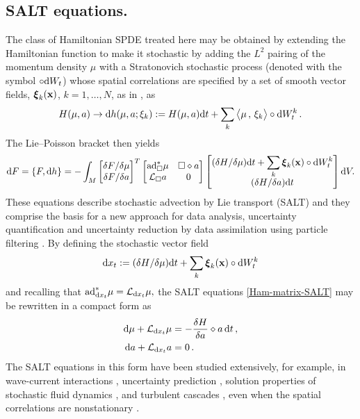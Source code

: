 \documentclass[11pt, oneside]{article}   	%
\numberwithin{equation}{section}
\theoremstyle{plain}
\theoremstyle{definition}
\theoremstyle{remark}
\newcommand{\<}{\langle}
\renewcommand{\>}{\rangle}
\def\diff{\textnormal{d}}
\def\x{{\bf{x}}}
\def\rmd{{\mathrm{d}}}
\newcommand{\scp}[2]{{\big\langle {#1}\, , \, {#2}\big\rangle}}
\newcommand{\mb}[1]{\mbox{\boldmath{$#1$}}}
\begin{document}
\subsection{SALT equations.}

The class of Hamiltonian SPDE treated here may be obtained by extending the Hamiltonian function to make it stochastic by adding the $L^2$ pairing of the momentum density $\mu$ with a Stratonovich stochastic process (denoted with the symbol $\circ \diff W_t$) whose spatial correlations are specified by a set of smooth vector fields, $\mb{\xi}_k(\x)$, $k=1,\dots,N$, as in 
\cite{Holm2015}, as
\begin{align}
H(\mu,a) \to \diff {h(\mu,a;\xi_k) }
:= H(\mu,a)\diff t + \displaystyle\sum_k\scp{\mu}{\xi_k}\circ \diff W_t^k
\,.\label{Stoch-Ham}
\end{align}
The Lie--Poisson bracket then yields  
\begin{align}
\diff  {F} =\{ F, \diff {h}\}
=
-\int_M 
\begin{bmatrix}
{\delta F}/{\delta \mu} \\  {\delta F}/{ \delta a} 
\end{bmatrix}^T
\begin{bmatrix}
{\rm ad}^*_{\Box}\mu & \Box \diamond a
\\ 
\mathcal{L}_{\Box}a & 0
\end{bmatrix}
\begin{bmatrix}
({\delta H } / {\delta \mu})\diff t + \displaystyle\sum_k\mb{\xi}_k(\x)\circ \diff W_t^k
\\  ({\delta H}/{ \delta a} ) \diff t 
\end{bmatrix}
{\rmd}V.
\label{Ham-matrix-SALT}
\end{align}
These equations describe stochastic advection by Lie transport (SALT)
\cite{Holm2015} and they comprise the basis for a new approach for data analysis, uncertainty quantification and uncertainty reduction by data assimilation using particle filtering \cite{CCHOS18b,CCHOS18a}. By defining the stochastic vector field 
\begin{align}
\diff{x_t} := 
({\delta H } / {\delta \mu})\diff t + \displaystyle\sum_k \mb{\xi}_k(\x)\circ \diff W_t^k
\label{Stoch-Lag-traj}
\end{align}
and recalling that ${\rm ad}^*_{{\rm d}x_t}\mu
= \mathcal{L}_{{\rm d}x_t}\mu,$ 
the SALT equations \eqref{Ham-matrix-SALT} may be rewritten in a compact form as 
\begin{align}
\begin{split}
\diff{\mu} + \mathcal{L}_{\diff{x_t}}\mu 
&= - \frac{\delta H }{\delta a}\diamond a \,\diff t
\,,\\
\diff{a} + \mathcal{L}_{\diff{x_t}}a &= 0
\,.
\end{split}
\label{SALT-adv-form}
\end{align}
The SALT equations in this form have been studied extensively, for example, in 
wave-current interactions \cite{Holm_WCI_JNLS2019}, uncertainty prediction \cite{GH19}, solution properties of stochastic fluid dynamics  \cite{CrFlHo2019, AloBetTak}, and turbulent cascades \cite{HolmTurbulent}, even when the spatial correlations are nonstationary \cite{GH18a,GH19}. 
\end{document}
